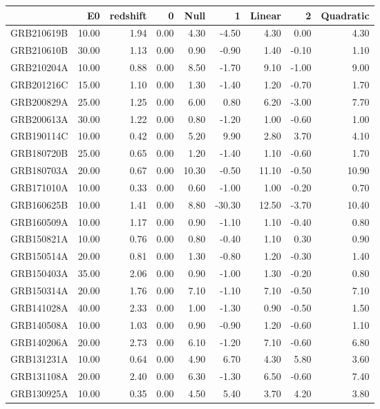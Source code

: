 \begin{tabular}{lrrrrrrrr}
\toprule
 & E0 & redshift & 0 & Null & 1 & Linear & 2 & Quadratic \\
\midrule
GRB210619B & 10.00 & 1.94 & 0.00 & 4.30 & -4.50 & 4.30 & 0.00 & 4.30 \\
GRB210610B & 30.00 & 1.13 & 0.00 & 0.90 & -0.90 & 1.40 & -0.10 & 1.10 \\
GRB210204A & 10.00 & 0.88 & 0.00 & 8.50 & -1.70 & 9.10 & -1.00 & 9.00 \\
GRB201216C & 15.00 & 1.10 & 0.00 & 1.30 & -1.40 & 1.20 & -0.70 & 1.70 \\
GRB200829A & 25.00 & 1.25 & 0.00 & 6.00 & 0.80 & 6.20 & -3.00 & 7.70 \\
GRB200613A & 30.00 & 1.22 & 0.00 & 0.80 & -1.20 & 1.00 & -0.60 & 1.00 \\
GRB190114C & 10.00 & 0.42 & 0.00 & 5.20 & 9.90 & 2.80 & 3.70 & 4.10 \\
GRB180720B & 25.00 & 0.65 & 0.00 & 1.20 & -1.40 & 1.10 & -0.60 & 1.70 \\
GRB180703A & 20.00 & 0.67 & 0.00 & 10.30 & -0.50 & 11.10 & -0.50 & 10.90 \\
GRB171010A & 10.00 & 0.33 & 0.00 & 0.60 & -1.00 & 1.00 & -0.20 & 0.70 \\
GRB160625B & 10.00 & 1.41 & 0.00 & 8.80 & -30.30 & 12.50 & -3.70 & 10.40 \\
GRB160509A & 10.00 & 1.17 & 0.00 & 0.90 & -1.10 & 1.10 & -0.40 & 0.80 \\
GRB150821A & 10.00 & 0.76 & 0.00 & 0.80 & -0.40 & 1.10 & 0.30 & 0.90 \\
GRB150514A & 20.00 & 0.81 & 0.00 & 1.30 & -0.80 & 1.20 & -0.30 & 1.40 \\
GRB150403A & 35.00 & 2.06 & 0.00 & 0.90 & -1.00 & 1.30 & -0.20 & 0.80 \\
GRB150314A & 20.00 & 1.76 & 0.00 & 7.10 & -1.10 & 7.10 & -0.50 & 7.10 \\
GRB141028A & 40.00 & 2.33 & 0.00 & 1.00 & -1.30 & 0.90 & -0.50 & 1.50 \\
GRB140508A & 10.00 & 1.03 & 0.00 & 0.90 & -0.90 & 1.20 & -0.60 & 1.10 \\
GRB140206A & 20.00 & 2.73 & 0.00 & 6.10 & -1.20 & 7.10 & -0.60 & 6.80 \\
GRB131231A & 10.00 & 0.64 & 0.00 & 4.90 & 6.70 & 4.30 & 5.80 & 3.60 \\
GRB131108A & 20.00 & 2.40 & 0.00 & 6.30 & -1.30 & 6.50 & -0.60 & 7.40 \\
GRB130925A & 10.00 & 0.35 & 0.00 & 4.50 & 5.40 & 3.70 & 4.20 & 3.80 \\

\end{tabular}
